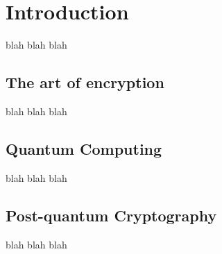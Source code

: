 \section{Introduction}
blah blah blah

\subsection{The art of encryption}
blah blah blah

\subsection{Quantum Computing}
blah blah blah

\subsection{Post-quantum Cryptography}
blah blah blah